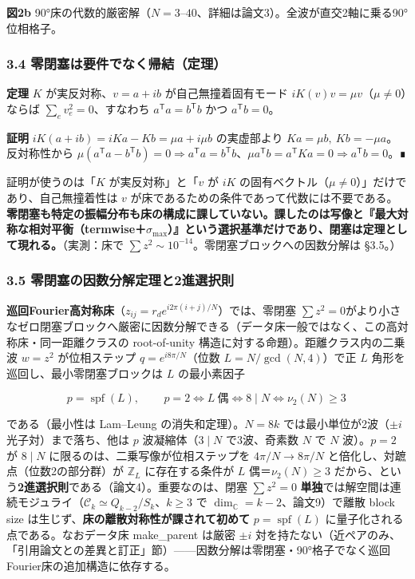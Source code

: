 \documentclass[
  a4paper,
]{ltjsarticle}
\begin{document}
\textbf{図2b}
90°床の代数的厳密解（\(N=3\)--\(40\)、詳細は論文3）。全波が直交2軸に乗る90°位相格子。

\subsubsection{3.4
零閉塞は要件でなく帰結（定理）}\label{ux96f6ux9589ux585eux306fux8981ux4ef6ux3067ux306aux304fux5e30ux7d50ux5b9aux7406}

\textbf{定理} \(K\) が実反対称、\(v=a+ib\) が自己無撞着固有モード
\(iK(v)v=\mu v\)（\(\mu\neq0\)）ならば \(\sum_e v_e^2=0\)、すなわち
\(a^{\mathsf T}a=b^{\mathsf T}b\) かつ \(a^{\mathsf T}b=0\)。

\textbf{証明} \(iK(a+ib)=iKa-Kb=\mu a+i\mu b\) の実虚部より
\(Ka=\mu b,\ Kb=-\mu a\)。反対称性から
\(\mu(a^{\mathsf T}a-b^{\mathsf T}b)=0\Rightarrow a^{\mathsf T}a=b^{\mathsf T}b\)、\(\mu a^{\mathsf T}b=a^{\mathsf T}Ka=0\Rightarrow a^{\mathsf T}b=0\)。∎

証明が使うのは「\(K\) が実反対称」と「\(v\) が \(iK\)
の固有ベクトル（\(\mu\neq0\)）」だけであり、自己無撞着性は \(v\)
が床であるための条件であって代数には不要である。\textbf{零閉塞も特定の振幅分布も床の構成に課していない。課したのは写像と『最大対称な相対平衡（termwise＋\(\sigma_{\max}\)）』という選択基準だけであり、閉塞は定理として現れる。}（実測：床で
\(\sum z^2\sim10^{-14}\)。零閉塞ブロックへの因数分解は §3.5。）

\subsubsection{3.5
零閉塞の因数分解定理と2進選択則}\label{ux96f6ux9589ux585eux306eux56e0ux6570ux5206ux89e3ux5b9aux7406ux30682ux9032ux9078ux629eux5247}

\textbf{巡回Fourier高対称床}（\(z_{ij}=r_d e^{i2\pi(i+j)/N}\)）では、零閉塞
\(\sum z^2=0\)がより小さなゼロ閉塞ブロックへ厳密に因数分解できる（データ床一般ではなく、この高対称床・同一距離クラスの
root-of-unity 構造に対する命題）。距離クラス内の二乗波 \(w=z^2\)
が位相ステップ \(q=e^{i8\pi/N}\)（位数 \(L=N/\gcd(N,4)\)）で正 \(L\)
角形を巡回し、最小零閉塞ブロックは \(L\) の最小素因子

\[p=\operatorname{spf}(L),\qquad \boxed{\,p=2\iff L\ \text{偶}\iff 8\mid N\iff \nu_2(N)\ge3\,}\]

である（最小性は Lam--Leung の消失和定理）。\(N=8k\)
では最小単位が2波（\(\pm i\) 光子対）まで落ち、他は \(p\)
波凝縮体（\(3\mid N\) で3波、奇素数 \(N\) で \(N\) 波）。\(p=2\) が
\(8\mid N\) に限るのは、二乗写像が位相ステップを \(4\pi/N\to8\pi/N\)
と倍化し、対蹠点（位数2の部分群）が \(\mathbb Z_L\) に存在する条件が
\(L\) 偶＝\(\nu_2(N)\ge3\)
だから、という\textbf{2進選択則}である（論文4）。重要なのは、閉塞
\(\sum z^2=0\)
\textbf{単独}では解空間は連続モジュライ（\(\mathcal C_k\simeq Q_{k-2}/S_k\)、\(k\ge3\)
で \(\dim_{\mathbb C}=k-2\)、論文9）で離散 block size
は生じず、\textbf{床の離散対称性が課されて初めて}
\(p=\operatorname{spf}(L)\) に量子化される点である。なおデータ床
make\_parent は厳密 \(\pm i\)
対を持たない（近ペアのみ、「引用論文との差異と訂正」節）------因数分解は零閉塞・90°格子でなく巡回Fourier床の追加構造に依存する。
\end{document}
